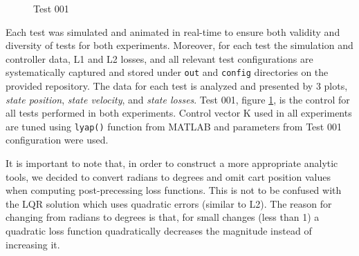 \documentclass[journal]{IEEEtran}
\begin{document}
\begin{figure}
\centering
{}
\caption{Test 001}
\label{fig:t001}
\end{figure}


Each test was simulated and animated in real-time to ensure both validity and
diversity of tests for both experiments. Moreover, for each test the simulation
and controller data, L1 and L2 losses, and all relevant test configurations
are systematically captured and stored under \texttt{out} and \texttt{config}
directories on the provided repository. The data for each test is analyzed and
presented by 3 plots, \emph{state position}, \emph{state velocity}, and
\emph{state losses}. Test 001, figure \ref{fig:t001}, is the control for all tests
performed in both experiments. Control vector K used in all experiments are
tuned using \texttt{lyap()} function from MATLAB and parameters from Test 001
configuration were used.

It is important to note that, in order to construct a more appropriate analytic tools,
we decided to convert radians to degrees and omit cart position values when computing
post-precessing loss functions. This is not to be confused with the LQR solution
which uses quadratic errors (similar to L2). The reason for changing from radians
to degrees is that, for small changes (less than 1) a quadratic loss function
quadratically decreases the magnitude instead of increasing it.
\end{document}
